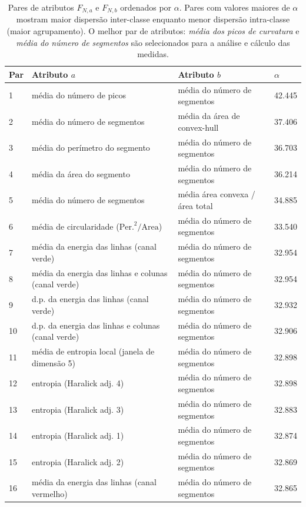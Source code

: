 \begin{table}[ht] \footnotesize
  \begin{center}
  \caption{\label{tab:alpha} Pares de atributos $F_{N, a}$ e $F_{N, b}$
    ordenados por
    $\alpha$. Pares com valores maiores de $\alpha$ mostram maior dispersão
    inter-classe enquanto menor dispersão intra-classe (maior agrupamento).
    O melhor par de atributos: \emph{média dos picos de curvatura} e
    \emph{média do número de segmentos} são selecionados para a análise e
    cálculo das medidas.}
\begin{tabular}{@{}llll}
 \hline \hline
 Par & Atributo $a$    & Atributo $b$   & $\alpha$ \\ 
 
 \hline
 
 1 & média do número de picos & média do número de segmentos & 42.445 \\
 2 & média do número de segmentos & média da área de convex-hull & 37.406 \\
 3 & média do perímetro do segmento & média do número de segmentos & 36.703 \\
 4 & média da área do segmento & média do número de segmentos & 36.214 \\
 5 & média do número de segmentos & média área convexa / área total & 34.885 \\
 6 & média de circularidade ($\mathrm{Per.}^2/\mathrm{Area}$) & média do número
 de segmentos & 33.540 \\
 7 & média da energia das linhas (canal verde) & média do número de segmentos & 32.954 \\
 8 & média da energia das linhas e colunas (canal verde) & média do número de segmentos & 32.954 \\
 9 & d.p. da energia das linhas (canal verde) & média do número de segmentos & 32.932 \\
 10 & d.p. da energia das linhas e colunas (canal verde) & média do número
 de segmentos & 32.906 \\
 11 & média de entropia local (janela de dimensão 5) & média do número de segmentos & 32.898 \\
 12 & entropia (Haralick adj. 4) & média do número de segmentos & 32.898 \\
 13 & entropia (Haralick adj. 3) & média do número de segmentos & 32.883 \\
 14 & entropia (Haralick adj. 1) & média do número de segmentos & 32.874 \\
 15 & entropia (Haralick adj. 2) & média do número de segmentos & 32.869 \\
 16 & média da energia das linhas (canal vermelho) & média do número de segmentos & 32.865 \\
\hline \hline
 \end{tabular}
\end{center}
\end{table}

